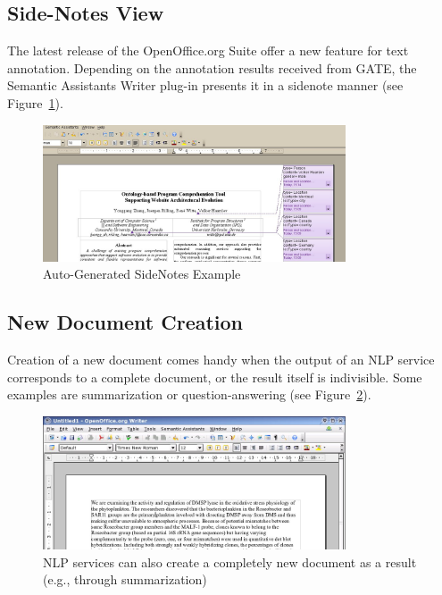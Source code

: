 \subsection{Side-Notes View}
The latest release of the OpenOffice.org Suite offer a new feature for text
annotation.  Depending on the annotation results received from GATE, the
Semantic Assistants Writer plug-in presents it in a sidenote manner (see
Figure~\ref{fig:sidenotes}).
\begin{figure}[htb]
  \centering
  \includegraphics[width=0.8\textwidth]{pictures/sidenotes.jpg}
  \caption{Auto-Generated SideNotes Example}
  \label{fig:sidenotes}
\end{figure}

\subsection{New Document Creation}
\label{sec:doc-cre}
Creation of a new document comes handy when the output of an NLP service
corresponds to a complete document, or the result itself is indivisible. Some
examples are summarization or question-answering (see Figure~\ref{fig:oores}).

\begin{figure}[htb]
  \centering
  \includegraphics[width=0.8\textwidth]{pictures/ooresult_clip.jpg}
  \vspace*{-2mm}
  \caption{NLP services can also create a completely new document as a
  result (e.g., through summarization)}
  \label{fig:oores}
\end{figure}


